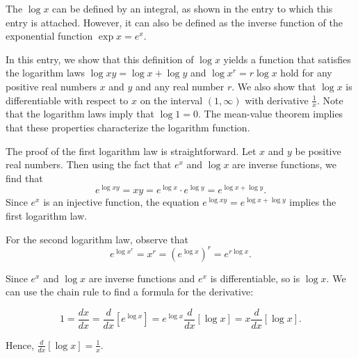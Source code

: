 \documentclass[12pt]{article}
\begin{document}

The  $\log x$ can be defined by an integral, as shown in the entry to which this entry is attached.  However, it can also be defined as the inverse function of the exponential function $\exp x =e^x$.  

In this entry, we show that this definition of $\log x$ yields a function that satisfies the logarithm laws $\log xy =\log x +\log y$ and $\log x^r =r\log x$ hold for any positive real numbers $x$ and $y$ and any real number $r$.  We also show that $\log x$ is differentiable with respect to $x$ on the interval $(1,\infty)$ with derivative $\frac{1}{x}$.  Note that the logarithm laws imply that $\log 1 =0$.  The mean-value theorem implies that these properties characterize the logarithm function.

The proof of the first logarithm law is straightforward.  Let $x$ and $y$ be positive real numbers.  Then using the fact that $e^x$ and $\log x$ are inverse functions, we find that
\[
e^{\log xy}=xy=e^{\log x}\cdot e^{\log y}=e^{\log x +\log y}.
\]
Since $e^x$ is an injective function, the equation $e^{\log xy}=e^{\log x +\log y}$ implies the first logarithm law.

For the second logarithm law, observe that
\[
e^{\log x^r}=x^r=(e^{\log x})^r=e^{r\log x}.
\]

Since $e^x$ and $\log x$ are inverse functions and $e^x$ is differentiable, so is $\log x$.  We can use the chain rule to find a formula for the derivative:

\[
1=\frac{dx}{dx}=\frac{d}{dx}[e^{\log x}]=e^{\log x}\frac{d}{dx}[\log x]=x\frac{d}{dx}[\log x].
\]

Hence, $\displaystyle \frac{d}{dx}[\log x]=\frac{1}{x}$.

%

\end{document}
